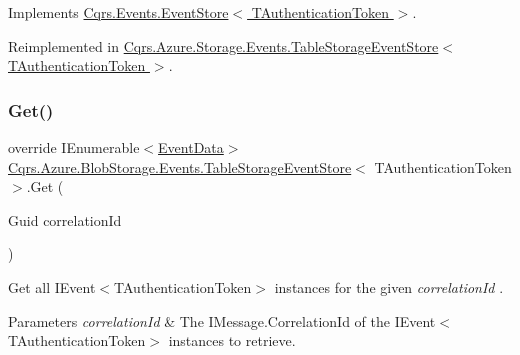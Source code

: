 Implements \hyperlink{classCqrs_1_1Events_1_1EventStore_aa1d0d399a35c1e3b0759e27202695d8b_aa1d0d399a35c1e3b0759e27202695d8b}{Cqrs.\+Events.\+Event\+Store$<$ T\+Authentication\+Token $>$}.



Reimplemented in \hyperlink{classCqrs_1_1Azure_1_1Storage_1_1Events_1_1TableStorageEventStore_a089514182da7a70f35f9237c521c49f0_a089514182da7a70f35f9237c521c49f0}{Cqrs.\+Azure.\+Storage.\+Events.\+Table\+Storage\+Event\+Store$<$ T\+Authentication\+Token $>$}.

\mbox{\label{classCqrs_1_1Azure_1_1BlobStorage_1_1Events_1_1TableStorageEventStore_a9b952a9257dc6f458b98eba87684412e_a9b952a9257dc6f458b98eba87684412e}} 
\subsubsection{\texorpdfstring{Get()}{Get()}\hspace{0.1cm}{\footnotesize\ttfamily [2/2]}}
{\footnotesize\ttfamily override I\+Enumerable$<$\hyperlink{classCqrs_1_1Events_1_1EventData}{Event\+Data}$>$ \hyperlink{classCqrs_1_1Azure_1_1BlobStorage_1_1Events_1_1TableStorageEventStore}{Cqrs.\+Azure.\+Blob\+Storage.\+Events.\+Table\+Storage\+Event\+Store}$<$ T\+Authentication\+Token $>$.Get (\begin{DoxyParamCaption}\item[{Guid}]{correlation\+Id }\end{DoxyParamCaption})\hspace{0.3cm}{\ttfamily [virtual]}}



Get all I\+Event$<$\+T\+Authentication\+Token$>$ instances for the given {\itshape correlation\+Id} . 


\begin{DoxyParams}{Parameters}
{\em correlation\+Id} & The I\+Message.\+Correlation\+Id of the I\+Event$<$\+T\+Authentication\+Token$>$ instances to retrieve.\\
\hline
\end{DoxyParams}


